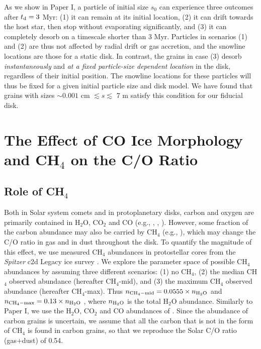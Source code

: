 \documentclass[apj]{emulateapj}
\newcommand{\emgr}[1]{\emph{ \color{gray} #1}}
\begin{document}
As we show in Paper I, a particle of initial size $s_0$ can experience three outcomes after $t_{\rm d}=3$ Myr: (1) it can remain at its initial location, (2) it can drift towards the host star, then stop without evaporating significantly, and (3) it can completely desorb on a timescale shorter than 3 Myr. Particles in scenarios (1) and (2) are thus not affected by radial drift or gas accretion, and the snowline locations are those for a static disk. In contrast, the grains in case (3) desorb \textit{instantaneously} and \textit{at a fixed particle-size dependent location} in the disk, regardless of their initial position. The snowline locations for these particles will thus be fixed for a given initial particle size and disk model. We have found that grains with sizes $\sim0.001$ cm $\lesssim s \lesssim$ 7 m satisfy this condition for our fiducial disk. 


\section{The Effect of CO Ice Morphology and CH$_4$ on the C/O Ratio}
\label{sec:CH4}

\subsection{Role of CH$_4$}

Both in Solar system comets and in protoplanetary disks, carbon and oxygen are primarily contained in H$_2$O, CO$_2$ and CO (e.g., \citealt{rodgers02}, \citealt{lodders03}, \citealt{pontoppidan06}). However, some fraction of the carbon abundance may also be carried by CH$_4$ (e.g., \citealt{mumma96}), which may change the C/O ratio in gas and in dust throughout the disk. To quantify the magnitude of this effect, we use measured CH$_4$ abundances in protostellar cores from the \textit{Spitzer} c2d Legacy ice survey \citep{evans03}. We explore the parameter space of possible CH$_4$ abundances by assuming three different scenarios: (1) no CH$_4$, (2) the median CH$_4$ observed abundance (hereafter CH$_4$-mid), and (3) the maximum CH$_4$ observed abundance (hereafter CH$_4$-max). Thus $n_{\rm CH_4-mid}=0.0555 \times n_{\rm H_2O}$ \citep{oberg11a} and $n_{\rm CH_4-max}=0.13 \times n_{\rm H_2O}$ \citep{oberg08}, where $n_{\rm H_2O}$ is the total H$_2$O abundance. Similarly to Paper I, we use the H$_2$O, CO$_2$ and CO abundances of \citet{oberg11}. Since the abundance of carbon grains is uncertain, we assume that all the carbon that is not in the form of CH$_4$ is found in carbon grains, so that we reproduce the Solar C/O ratio (gas+dust) of 0.54.  
\end{document}
